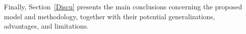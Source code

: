 \documentclass[preprint,12pt,authoryear]{elsarticle}
\begin{document}
Finally, Section~\ref{Discu} presents the main conclusions concerning the
proposed model and methodology, together with their potential
generalizations, advantages, and limitations.












\end{document}
